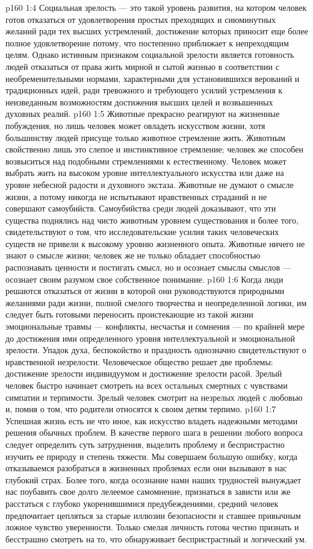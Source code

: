 \vs p160 1:4 Социальная зрелость --- это такой уровень развития, на котором человек готов отказаться от удовлетворения простых преходящих и сиюминутных желаний ради тех высших устремлений, достижение которых приносит еще более полное удовлетворение потому, что постепенно приближает к непреходящим целям. Однако истинным признаком социальной зрелости является готовность людей отказаться от права жить мирной и сытой жизнью в соответствии с необременительными нормами, характерными для установившихся верований и традиционных идей, ради тревожного и требующего усилий устремления к неизведанным возможностям достижения высших целей и возвышенных духовных реалий.
\vs p160 1:5 Животные прекрасно реагируют на жизненные побуждения, но лишь человек может овладеть искусством жизни, хотя большинству людей присуще только животное стремление жить. Животным свойственно лишь это слепое и инстинктивное стремление; человек же способен возвыситься над подобными стремлениями к естественному. Человек может выбрать жить на высоком уровне интеллектуального искусства или даже на уровне небесной радости и духовного экстаза. Животные не думают о смысле жизни, а потому никогда не испытывают нравственных страданий и не совершают самоубийств. Самоубийства среди людей доказывают, что эти существа поднялись над чисто животным уровнем существования и более того, свидетельствуют о том, что исследовательские усилия таких человеческих существ не привели к высокому уровню жизненного опыта. Животные ничего не знают о смысле жизни; человек же не только обладает способностью распознавать ценности и постигать смысл, но и осознает смыслы смыслов --- осознает своим разумом свое собственное понимание.
\vs p160 1:6 Когда люди решаются отказаться от жизни в которой они руководствуются природными желаниями ради жизни, полной смелого творчества и неопределенной логики, им следует быть готовыми переносить проистекающие из такой жизни эмоциональные травмы --- конфликты, несчастья и сомнения --- по крайней мере до достижения ими определенного уровня интеллектуальной и эмоциональной зрелости. Упадок духа, беспокойство и праздность однозначно свидетельствуют о нравственной незрелости. Человеческое общество решает две проблемы: достижение зрелости индивидуумом и достижение зрелости расой. Зрелый человек быстро начинает смотреть на всех остальных смертных с чувствами симпатии и терпимости. Зрелый человек смотрит на незрелых людей с любовью и, помня о том, что родители относятся к своим детям терпимо.
\vs p160 1:7 Успешная жизнь есть не что иное, как искусство владеть надежными методами решения обычных проблем. В качестве первого шага в решении любого вопроса следует определить суть затруднения, выделить проблему и беспристрастно изучить ее природу и степень тяжести. Мы совершаем большую ошибку, когда отказываемся разобраться в жизненных проблемах если они вызывают в нас глубокий страх. Более того, когда осознание нами наших трудностей вынуждает нас поубавить свое долго лелеемое самомнение, признаться в зависти или же расстаться с глубоко укоренившимися предубеждениями, средний человек предпочитает цепляться за старые иллюзии безопасности и ставшее привычным ложное чувство уверенности. Только смелая личность готова честно признать и бесстрашно смотреть на то, что обнаруживает беспристрастный и логический ум.
